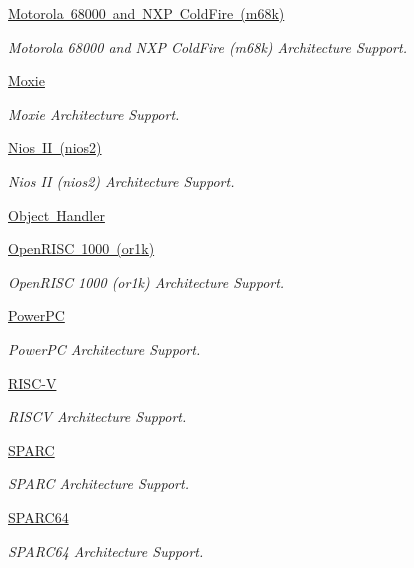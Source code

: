 \begin{DoxyCompactItemize}
\mbox{\hyperlink{group__RTEMSScoreCPUm68k}{Motorola 68000 and N\+X\+P Cold\+Fire (m68k)}}
\begin{DoxyCompactList}\small\item\em Motorola 68000 and N\+XP Cold\+Fire (m68k) Architecture Support. \end{DoxyCompactList}\item 
\mbox{\hyperlink{group__RTEMSScoreCPUMoxie}{Moxie}}
\begin{DoxyCompactList}\small\item\em Moxie Architecture Support. \end{DoxyCompactList}\item 
\mbox{\hyperlink{group__RTEMSScoreCPUnios2}{Nios I\+I (nios2)}}
\begin{DoxyCompactList}\small\item\em Nios II (nios2) Architecture Support. \end{DoxyCompactList}\item 
\mbox{\hyperlink{group__RTEMSScoreObject}{Object Handler}}
\item 
\mbox{\hyperlink{group__RTEMSScoreCPUor1k}{Open\+R\+I\+S\+C 1000 (or1k)}}
\begin{DoxyCompactList}\small\item\em Open\+R\+I\+SC 1000 (or1k) Architecture Support. \end{DoxyCompactList}\item 
\mbox{\hyperlink{group__RTEMSScoreCPUPowerPC}{Power\+PC}}
\begin{DoxyCompactList}\small\item\em Power\+PC Architecture Support. \end{DoxyCompactList}\item 
\mbox{\hyperlink{group__RTEMSScoreCPURISCV}{R\+I\+S\+C-\/V}}
\begin{DoxyCompactList}\small\item\em R\+I\+S\+CV Architecture Support. \end{DoxyCompactList}\item 
\mbox{\hyperlink{group__RTEMSScoreCPUSPARC}{S\+P\+A\+RC}}
\begin{DoxyCompactList}\small\item\em S\+P\+A\+RC Architecture Support. \end{DoxyCompactList}\item 
\mbox{\hyperlink{group__RTEMSScoreCPUSPARC64}{S\+P\+A\+R\+C64}}
\begin{DoxyCompactList}\small\item\em S\+P\+A\+R\+C64 Architecture Support. \end{DoxyCompactList}\item 

\end{DoxyCompactItemize}
